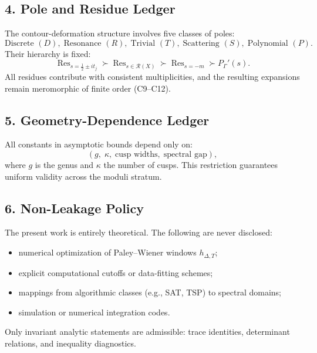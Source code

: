 \subsection*{4. Pole and Residue Ledger}\relax\hspace{0pt}

The contour-deformation structure involves five classes of poles:
\[
\text{Discrete } (D),\;
\text{Resonance } (R),\;
\text{Trivial } (T),\;
\text{Scattering } (S),\;
\text{Polynomial } (P).
\]
Their hierarchy is fixed:
\[
\operatorname{Res}_{s=\tfrac{1}{2}\pm it_j}
\succ
\operatorname{Res}_{s\in\mathcal{R}(X)}
\succ
\operatorname{Res}_{s=-m}
\succ
P_\Gamma'(s).
\]
All residues contribute with consistent multiplicities,
and the resulting expansions remain meromorphic of finite order (C9–C12).

\subsection*{5. Geometry-Dependence Ledger}\relax\hspace{0pt}

All constants in asymptotic bounds depend only on:
\[
(g,\;\kappa,\;\text{cusp widths},\;\text{spectral gap}),
\]
where $g$ is the genus and $\kappa$ the number of cusps.
This restriction guarantees uniform validity across the moduli stratum.

\subsection*{6. Non-Leakage Policy}\relax\hspace{0pt}

The present work is entirely theoretical.
The following are never disclosed:
\begin{itemize}
\item numerical optimization of Paley–Wiener windows $h_{\Delta,T}$;
\item explicit computational cutoffs or data-fitting schemes;
\item mappings from algorithmic classes (e.g., SAT, TSP) to spectral domains;
\item simulation or numerical integration codes.
\end{itemize}
Only invariant analytic statements are admissible:
trace identities, determinant relations, and inequality diagnostics.

